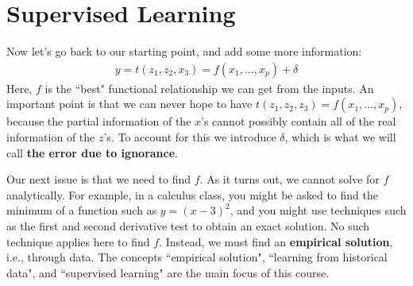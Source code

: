 \documentclass[12pt, a4paper]{article}
\begin{document}
	\section*{Supervised Learning}
	Now let's go back to our starting point, and add some more information:
	\begin{align*}
		y = t(z_1,z_2, x_3) = f(x_1,\ldots,x_p) + \delta
	\end{align*}
	Here, $f$ is the ``best" functional relationship we can get from the inputs. An
	important point is that we can never hope to have $t(z_1,z_2,z_3)=f(x_1,\ldots,x_p)$, because
	the partial information of the $x$'s cannot possibly contain all of the real information
	of the $z$'s. To account for this we introduce $\delta$, which is what we will
	call \textbf{the error due to ignorance}.
	
	Our next issue is that we need to find $f$. As it turns out, we cannot solve for $f$
	analytically. For example, in a calculus class, you might be asked to find the minimum
	of a function such as $y=(x-3)^2$, and you might use techniques such as the first and second
	derivative test to obtain an exact solution. No such technique applies here to find $f$. Instead,
	we must find an \textbf{empirical solution}, i.e., through data. The concepts
	``empirical solution", ``learning from historical data", and ``supervised learning"
	are the main focus of this course.
	
\end{document}

